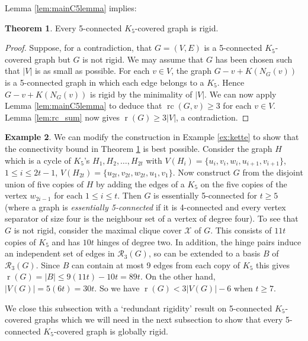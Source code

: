 \documentclass[11pt,a4paper]{article}
\theoremstyle{definition}
\newtheorem{theorem}{Theorem}[section]
\newtheorem{example}[theorem]{Example}
\DeclareMathOperator{\rr}{r}
\DeclareMathOperator{\rc}{rc}
\newcommand{\cR}{\mathcal{R}}
\newcommand{\cX}{\mathcal{X}}
\begin{document}
Lemma \ref{lem:mainC5lemma} implies:

\begin{theorem}\label{coro:c5c5:rigid}
    Every 5-connected $K_5$-covered graph 
    is rigid.
\end{theorem}
\begin{proof}
    Suppose, for a contradiction, that $G=(V,E)$ is a 5-connected $K_5$-covered graph
    but $G$ is not rigid.
    We may
    assume that $G$ has been chosen such that $|V|$ is as small as possible.
    For each $v\in V$, the graph $G-v+K(N_G(v))$ is a 5-connected graph in which each edge belongs to a $K_5$. Hence $G-v+K(N_G(v))$ is rigid by the minimality of $|V|$. We can now apply Lemma \ref{lem:mainC5lemma} to deduce that $\rc(G,v)\geq 3$ for each $v\in V$. Lemma \ref{lem:rc_sum} now gives
    $\rr(G)\geq 3|V|$, a contradiction.
\end{proof}

\begin{example} \label{ex:egy}
We can modify the construction in Example \ref{ex:kette} to show that the connectivity bound in Theorem \ref{coro:c5c5:rigid} 
is best possible. 
Consider the graph $H$ which is a cycle of $K_5$'s
$H_1,H_2,\ldots,H_{2t}$ with $V(H_i)=\{u_i,v_i,w_i,u_{i+1},v_{i+1}\}$,
$1\leq i\leq 2t-1$, $V(H_{2t})=\{u_{2t},v_{2t},w_{2t},u_{1},v_{1}\}$. 
Now construct $G$ from the disjoint union of five copies of $H$ by adding the edges of a $K_5$ on the five copies of the vertex $w_{2i-1}$ for each $1\leq i\leq t$. Then $G$ is essentially 5-connected for $t\geq 5$ (where a graph is  {\em essentially 5-connected} if it is 4-connected and every vertex separator of size four is the neighbour set of a vertex of degree four).
To see that $G$ is not rigid, consider the maximal clique cover $\cX$ of $G$. This consists of $11t$ copies of $K_5$ and has $10t$ hinges of degree two.
In addition, the hinge pairs induce an independent set of edges in $\cR_3(G)$, so can be extended to a basis $B$ of $\cR_3(G)$. Since $B$ can contain at most 9 edges from each copy of $K_5$ this gives 
$\rr(G)=|B|\leq  9(11t)-10t=89t$. On the other hand, $|V(G)|=5(6t)=30t$. So we have $\rr(G)<3|V(G)|-6$ when $t\geq 7$.
\end{example}



We close this subsection with  a `redundant rigidity' result on  5-connected $K_5$-covered graphs which we will need  in the next subsection to show that  every 5-connected $K_5$-covered graph 
    is globally rigid. 
    
\end{document}
